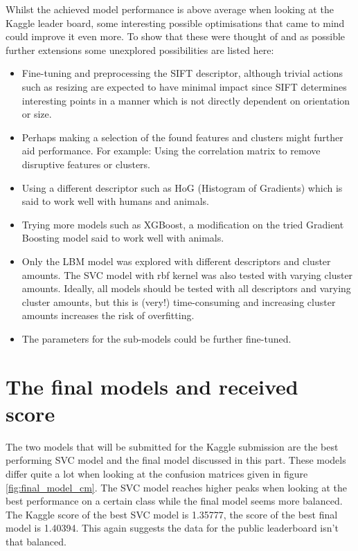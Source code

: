 Whilst the achieved model performance is above average when looking at the Kaggle leader board, some interesting possible optimisations that came to mind could improve it even more.
To show that these were thought of and as possible further extensions some unexplored possibilities are listed here:
\begin{itemize}
    \item Fine-tuning and preprocessing the SIFT descriptor, although trivial actions such as resizing are expected to have minimal impact since SIFT determines interesting points in a manner which is not directly dependent on orientation or size.
    \item Perhaps making a selection of the found features and clusters might further aid performance. For example: Using the correlation matrix to remove disruptive features or clusters.
    \item Using a different descriptor such as HoG (Histogram of Gradients) which is said to work well with humans and animals.
    \item Trying more models such as XGBoost, a modification on the tried Gradient Boosting model said to work well with animals.
    \item Only the LBM model was explored with different descriptors and cluster amounts. The SVC model with rbf kernel was also tested with varying cluster amounts. Ideally, all models should be tested with all descriptors and varying cluster amounts, but this is (very!) time-consuming and increasing cluster amounts increases the risk of overfitting.
    \item The parameters for the sub-models could be further fine-tuned.
\end{itemize}

\clearpage
\section{The final models and received score}
\label{section:opt_score}

The two models that will be submitted for the Kaggle submission are the best performing SVC model and the final model discussed in this part.
These models differ quite a lot when looking at the confusion matrices given in figure \ref{fig:final_model_cm}.
The SVC model reaches higher peaks when looking at the best performance on a certain class while the final model seems more balanced.
The Kaggle score of the best SVC model is 1.35777, the score of the best final model is 1.40394. 
This again suggests the data for the public leaderboard isn't that balanced.


